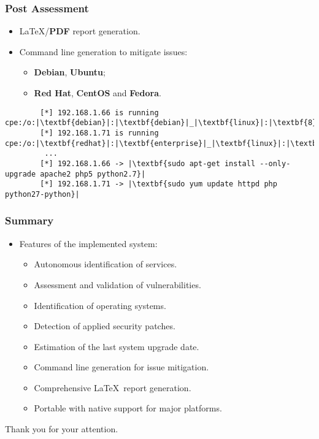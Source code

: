 \documentclass[aspectratio=169,xcolor={usenames,dvipsnames}]{beamer}
\newcommand{\ispace}{\vspace{10pt}}
\begin{document}
\begin{frame}[fragile]
	\frametitle{Post Assessment}
	
	\begin{itemize}
		\item \LaTeX/\textbf{PDF} report generation.
	\end{itemize}
	
	\ispace
	
	\begin{itemize}
		\item Command line generation to mitigate issues:
		\begin{itemize}
			\item \textbf{Debian}, \textbf{Ubuntu};
			\item \textbf{Red Hat}, \textbf{CentOS} and \textbf{Fedora}.
		\end{itemize}
	\end{itemize}
	
	\ispace
	
	\begin{center}
	\begin{minipage}{.91\textwidth}
	\begin{verbatim}
		[*] 192.168.1.66 is running cpe:/o:|\textbf{debian}|:|\textbf{debian}|_|\textbf{linux}|:|\textbf{8}|
		[*] 192.168.1.71 is running cpe:/o:|\textbf{redhat}|:|\textbf{enterprise}|_|\textbf{linux}|:|\textbf{7}|
		 ... 
		[*] 192.168.1.66 -> |\textbf{sudo apt-get install --only-upgrade apache2 php5 python2.7}|
		[*] 192.168.1.71 -> |\textbf{sudo yum update httpd php python27-python}|
	\end{verbatim}
	\end{minipage}
	\end{center}
\end{frame}

\begin{frame}
	\frametitle{Summary}
	
	\begin{itemize}
		\item Features of the implemented system:
		\begin{itemize}
			\item Autonomous identification of services.
			\item Assessment and validation of vulnerabilities.
			\item Identification of operating systems.
			\item Detection of applied security patches.
			\item Estimation of the last system upgrade date.
			\item Command line generation for issue mitigation.
			\item Comprehensive \LaTeX\ report generation.
			\item Portable with native support for major platforms.
		\end{itemize}
	\end{itemize}
	
	\vspace{15pt}
	
	{\Large Thank you for your attention.}
\end{frame}
\end{document}

